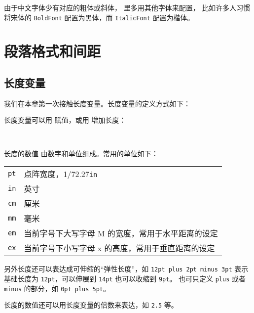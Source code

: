 由于中文字体少有对应的粗体或斜体， 里多用其他字体来配置，
比如许多人习惯将宋体的 \texttt{BoldFont} 配置为黑体，而 \texttt{ItalicFont} 配置为楷体。

\section{段落格式和间距}\label{sec:par-lengths}

\subsection{长度变量}\label{subsec:lengths}

我们在本章第一次接触长度变量。长度变量的定义方式如下：
\begin{command}
\end{command}

长度变量可以用  赋值，或用  增加长度：
\begin{command}
 \\
\end{command}

长度的数值  由数字和单位组成。常用的单位如下：

\begin{center}
\begin{tabular}{cp{140pt}}
 \hline
 \texttt{pt} & 点阵宽度，1/72.27\texttt{in} \\
 \texttt{in} & 英寸 \\
 \texttt{cm} & 厘米 \\
 \texttt{mm} & 毫米 \\
 \hline
 \texttt{em} & 当前字号下大写字母 M 的宽度，常用于水平距离的设定 \\
 \texttt{ex} & 当前字号下小写字母 x 的高度，常用于垂直距离的设定 \\
 \hline
\end{tabular}
\end{center}

另外长度还可以表达成可伸缩的“弹性长度”，如 \texttt{12pt plus 2pt minus 3pt} 
表示基础长度为 \texttt{12pt}，可以伸展到 \texttt{14pt} 也可以收缩到 \texttt{9pt}。
也可只定义 \texttt{plus} 或者 \texttt{minus} 的部分，如 \texttt{0pt plus 5pt}。

长度的数值还可以用长度变量的倍数来表达，如 \texttt{2.5} 等。

